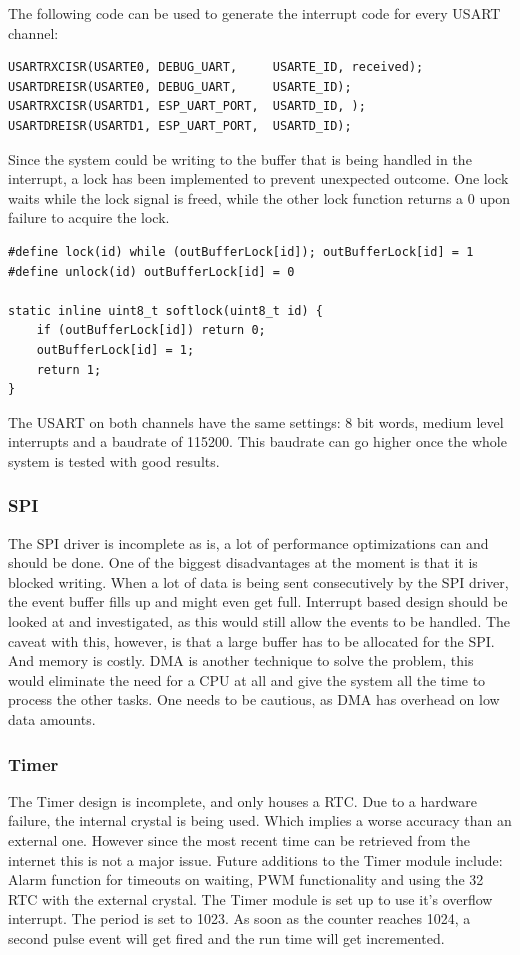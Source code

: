 The following code can be used to generate the interrupt code for every USART channel:\newpage
\begin{verbatim}
USARTRXCISR(USARTE0, DEBUG_UART,     USARTE_ID, received);
USARTDREISR(USARTE0, DEBUG_UART,     USARTE_ID);
USARTRXCISR(USARTD1, ESP_UART_PORT,  USARTD_ID, );
USARTDREISR(USARTD1, ESP_UART_PORT,  USARTD_ID);
\end{verbatim}
Since the system could be writing to the buffer that is being handled in the interrupt, a lock has been implemented to prevent unexpected outcome. One lock waits while the lock signal is freed, while the other lock function returns a 0 upon failure to acquire the lock.
\begin{verbatim}
#define lock(id) while (outBufferLock[id]); outBufferLock[id] = 1
#define unlock(id) outBufferLock[id] = 0

static inline uint8_t softlock(uint8_t id) {
	if (outBufferLock[id]) return 0;
	outBufferLock[id] = 1;
	return 1;
}
\end{verbatim}
The USART on both channels have the same settings: 8 bit words, medium level interrupts and a baudrate of 115200. This baudrate can go higher once the whole system is tested with good results.
\subsubsection{SPI}
The SPI driver is incomplete as is, a lot of performance optimizations can and should be done. One of the biggest disadvantages at the moment is that it is blocked writing. When a lot of data is being sent consecutively by the SPI driver, the event buffer fills up and might even get full. Interrupt based design should be looked at and investigated, as this would still allow the events to be handled. The caveat with this, however, is that a large buffer has to be allocated for the SPI. And memory is costly. DMA is another technique to solve the problem, this would eliminate the need for a CPU at all and give the system all the time to process the other tasks. One needs to be cautious, as DMA has overhead on low data amounts.
\subsubsection{Timer}
The Timer design is incomplete, and only houses a RTC. Due to a hardware failure, the internal crystal is being used. Which implies a worse accuracy than an external one. However since the most recent time can be retrieved from the internet this is not a major issue. Future additions to the Timer module include: Alarm function for timeouts on waiting, PWM functionality and using the 32 RTC with the external crystal. The Timer module is set up to use it's overflow interrupt. The period is set to 1023. As soon as the counter reaches 1024, a second pulse event will get fired and the run time will get incremented.
